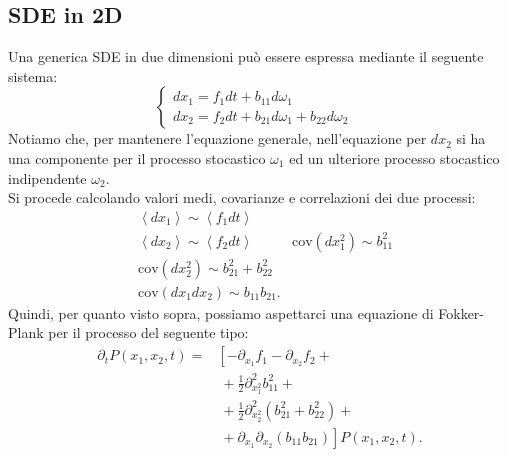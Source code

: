 \subsection{SDE in 2D}%
\label{sub:SDE in 2D}
Una generica SDE in due dimensioni può essere espressa mediante il seguente sistema:
\begin{equation}
    \begin{cases}
	dx_1 = f_1 dt + b_{11}d\omega_1 &\\
	dx_2 = f_2 dt + b_{21} d\omega_1 + b_{22}d\omega_2&
    \end{cases}
\end{equation}
Notiamo che, per mantenere l'equazione generale, nell'equazione per $dx_2$ si ha una componente per il processo stocastico $\omega_1$ ed un ulteriore processo stocastico indipendente $\omega_2$.\\
Si procede calcolando valori medi, covarianze e correlazioni dei due processi:
\[\begin{aligned}
   &\left<dx_1\right> \sim  \left<f_1dt\right> \\
   &\left<dx_2\right> \sim  \left<f_2dt\right>
   &\mbox{cov}(dx_1^2) \sim b_{11}^2\\
   & \mbox{cov}(dx_2^2) \sim b_{21}^2 + b_{22}^2\\
   &\mbox{cov}(dx_1dx_2) \sim b_{11}b_{21}
.\end{aligned}\]
Quindi, per quanto visto sopra, possiamo aspettarci una equazione di Fokker-Plank per il processo del seguente tipo:
\[\begin{aligned}
    \partial_t P(x_1,x_2,t) =& \left[-\partial_{x_1}f_1 -\partial_{x_2}f_2 \right. + \\
			     & \ + \frac{1}{2}\partial^2_{x_1^2} b_{11}^2 + \\
			     & \ + \frac{1}{2}\partial^2_{x_2^2}\left(b_{21}^2 + b_{22}^2\right) + \\
			     & \ + \left.\partial_{x_1} \partial_{x_2}\left(b_{11}b_{21}\right)\right] P(x_1,x_2,t)
.\end{aligned}\]

\clearpage
